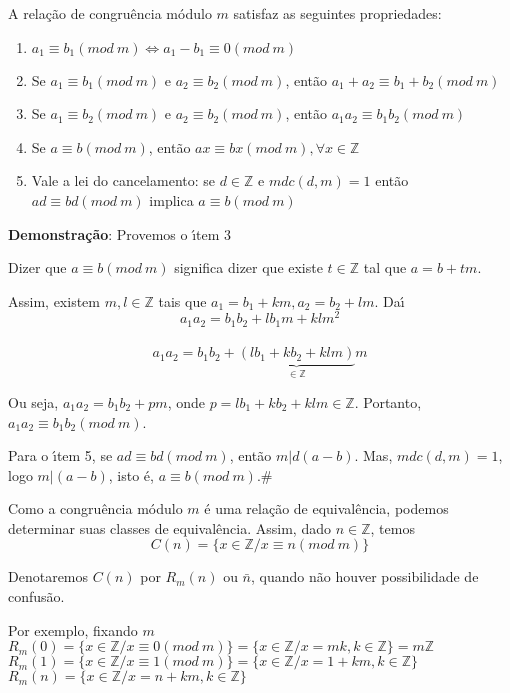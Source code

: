 \begin{teorema} A rela{\c c}{\~a}o de congru{\^e}ncia m{\'o}dulo $m$ satisfaz as seguintes propriedades:
\begin{enumerate}
\item $a_{1}\equiv b_{1}(mod\ m)\Leftrightarrow a_{1}-b_{1}\equiv 0(mod\ m)$
\item Se $a_{1}\equiv b_{1}(mod\ m)$ e $a_{2}\equiv b_{2}(mod\ m)$, ent{\~a}o $a_{1}+a_{2}\equiv b_{1}+b_{2}(mod\ m)$
\item Se $a_{1}\equiv b_{2}(mod\ m)$ e $a_{2}\equiv b_{2}(mod\ m)$, ent{\~a}o $a_{1}a_{2}\equiv b_{1}b_{2}(mod\ m)$
\item Se $a\equiv b(mod\ m)$, ent{\~a}o $ax\equiv bx(mod\ m), \forall x\in\mathbb{Z}$
\item Vale a lei do cancelamento: se $d\in\mathbb{Z}$ e $mdc(d,m)=1$ ent{\~a}o\\ $ad\equiv bd(mod\ m)$ implica $a\equiv b(mod\ m)$

\end{enumerate}
\end{teorema}

\textbf{Demonstra{\c c}{\~a}o}: Provemos o {\'\i}tem 3

Dizer que $a\equiv b(mod\ m)$ significa dizer que existe $t\in\mathbb{Z}$ tal que $a=b+tm$.

Assim, existem $m,l\in\mathbb{Z}$ tais que $a_{1}=b_{1}+km, a_{2}=b_{2}+lm$. Da{\'\i}\\
\[a_{1}a_{2}=b_{1}b_{2}+lb_{1}m+klm^{2}\]\\
\[a_{1}a_{2}=b_{1}b_{2}+\underbrace{(lb_{1}+kb_{2}+klm)}_{\in\mathbb{Z}}m\]

Ou seja, $a_{1}a_{2}=b_{1}b_{2}+pm$, onde $p=lb_{1}+kb_{2}+klm\in\mathbb{Z}$. Portanto, $a_{1}a_{2}\equiv b_{1}b_{2}(mod\ m)$.

Para o {\'\i}tem 5, se $ad\equiv bd(mod\ m)$, ent{\~a}o $m|d(a-b)$. Mas, $mdc(d,m)=1$, logo $m|(a-b)$, isto {\'e}, $a\equiv b(mod\ m)$.\#

Como a congru{\^e}ncia m{\'o}dulo $m$ {\'e} uma rela{\c c}{\~a}o de equival{\^e}ncia, podemos determinar suas classes de equival{\^e}ncia. Assim, dado $n\in\mathbb{Z}$, temos
\[C(n)=\{x\in\mathbb{Z}/x\equiv n(mod\ m)\}\]

Denotaremos $C(n)$ por $R_{m}(n)$ ou $\bar{n}$, quando n{\~a}o houver possibilidade de confus{\~a}o.

Por exemplo, fixando $m$\\
$R_{m}(0)=\{x\in\mathbb{Z}/x\equiv 0(mod\ m)\}=\{x\in \mathbb{Z}/x=mk, k\in\mathbb{Z}\}=m\mathbb{Z}$\\
$R_{m}(1)=\{x\in\mathbb{Z}/x\equiv 1(mod\ m)\}=\{x\in\mathbb{Z}/x=1+km, k\in\mathbb{Z}\}$\\
$R_{m}(n)=\{x\in\mathbb{Z}/x=n+km, k\in\mathbb{Z}\}$

